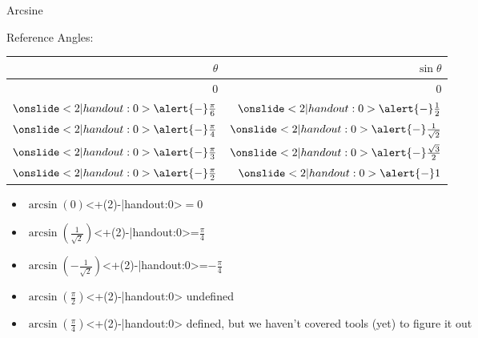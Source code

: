 \begin{frame}[t]{Arcsine}
\begin{multicols}{2}
Reference Angles:\\[1em]
\begin{tabular}{|r|r|}
\hline
$\theta$ & $\sin \theta$\\
\hline\hline
0 & 0\\\hline
$\onslide<2|handout:0>{\alert{-}}\frac\pi6 $& $\onslide<2|handout:0>{\alert{-}}\frac12 $\\[1mm] \hline
$\onslide<2|handout:0>{\alert{-}}\frac\pi4$ & $\onslide<2|handout:0>{\alert{-}}\frac1{\sqrt 2}$\\[1mm] \hline
$\onslide<2|handout:0>{\alert{-}}\frac\pi3 $& $\onslide<2|handout:0>{\alert{-}}\frac{\sqrt 3}2 $\\[1mm] \hline
$\onslide<2|handout:0>{\alert{-}}\frac\pi2 $& $ \onslide<2|handout:0>{\alert{-}}1$\\[1mm] \hline
\end{tabular}\columnbreak
\begin{itemize}[<+(2)->]
\item $\arcsin(0)$\onslide<+(2)-|handout:0>{\textcolor{answercolor}{$=0$}}
\item $\arcsin\left(\frac1{\sqrt 2}\right)$\onslide<+(2)-|handout:0>{\textcolor{answercolor}{=$\frac{\pi}{4}$}}
\item $\arcsin\left(-\frac{1}{\sqrt 2}\right)$\onslide<+(2)-|handout:0>{\textcolor{answercolor}{=$-\frac{\pi}{4}$}}
\item $\arcsin\left(\frac{\pi}{ 2}\right)$\onslide<+(2)-|handout:0>{\textcolor{answercolor}{ undefined}}
\item $\arcsin\left(\frac{\pi}{ 4}\right)$\onslide<+(2)-|handout:0>{\textcolor{answercolor}{ defined, but we haven't covered tools (yet) to figure it out}}
\end{itemize}

\end{multicols}

\end{frame}

